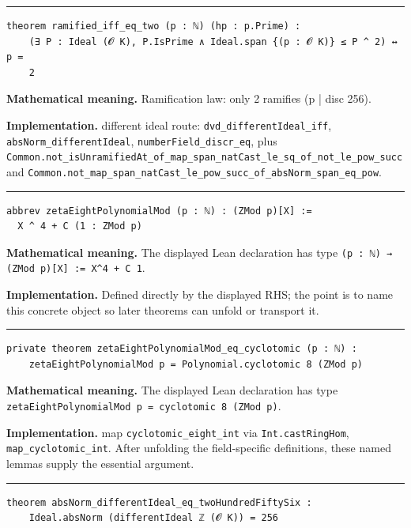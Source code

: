 \documentclass[UTF8,a4paper,11pt,fontset=fandol]{ctexart}
\theoremstyle{definition}
\newcommand{\statementsep}{\par\medskip\hrule\medskip}
\begin{document}
\statementsep
\begin{verbatim}
theorem ramified_iff_eq_two (p : ℕ) (hp : p.Prime) :
    (∃ P : Ideal (𝓞 K), P.IsPrime ∧ Ideal.span {(p : 𝓞 K)} ≤ P ^ 2) ↔ p =
    2
\end{verbatim}
\noindent\textbf{Mathematical meaning.} Ramification law: only 2 ramifies (p | disc 256).\par
\noindent\textbf{Implementation.} different ideal route: \texttt{dvd\_\allowbreak{}differentIdeal\_\allowbreak{}iff}, \texttt{absNorm\_\allowbreak{}differentIdeal}, \texttt{numberField\_\allowbreak{}discr\_\allowbreak{}eq}, plus \texttt{Common.\allowbreak{}not\_\allowbreak{}isUnramifiedAt\_\allowbreak{}of\_\allowbreak{}map\_\allowbreak{}span\_\allowbreak{}natCast\_\allowbreak{}le\_\allowbreak{}sq\_\allowbreak{}of\_\allowbreak{}not\_\allowbreak{}le\_\allowbreak{}pow\_\allowbreak{}succ} and \texttt{Common.\allowbreak{}not\_\allowbreak{}map\_\allowbreak{}span\_\allowbreak{}natCast\_\allowbreak{}le\_\allowbreak{}pow\_\allowbreak{}succ\_\allowbreak{}of\_\allowbreak{}absNorm\_\allowbreak{}span\_\allowbreak{}eq\_\allowbreak{}pow}.\par
\statementsep
\begin{verbatim}
abbrev zetaEightPolynomialMod (p : ℕ) : (ZMod p)[X] :=
  X ^ 4 + C (1 : ZMod p)
\end{verbatim}
\noindent\textbf{Mathematical meaning.} The displayed Lean declaration has type \texttt{(p : ℕ) → (ZMod p)[X] := X\textasciicircum{}4 + C 1}.\par
\noindent\textbf{Implementation.} Defined directly by the displayed RHS; the point is to name this concrete object so later theorems can unfold or transport it.\par
\statementsep
\begin{verbatim}
private theorem zetaEightPolynomialMod_eq_cyclotomic (p : ℕ) :
    zetaEightPolynomialMod p = Polynomial.cyclotomic 8 (ZMod p)
\end{verbatim}
\noindent\textbf{Mathematical meaning.} The displayed Lean declaration has type \texttt{zetaEightPolynomialMod p = cyclotomic 8 (ZMod p)}.\par
\noindent\textbf{Implementation.} map \texttt{cyclotomic\_\allowbreak{}eight\_\allowbreak{}int} via \texttt{Int.\allowbreak{}castRingHom}, \texttt{map\_\allowbreak{}cyclotomic\_\allowbreak{}int}. After unfolding the field-specific definitions, these named lemmas supply the essential argument.\par
\statementsep
\begin{verbatim}
theorem absNorm_differentIdeal_eq_twoHundredFiftySix :
    Ideal.absNorm (differentIdeal ℤ (𝓞 K)) = 256
\end{verbatim}
\end{document}

